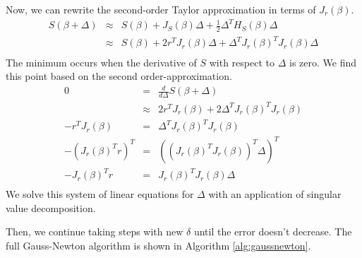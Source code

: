 Now, we can rewrite the second-order Taylor approximation in terms of $J_r(\beta)$.
\begin{eqnarray*}
	S(\beta + \Delta) &\approx& S(\beta) + J_S(\beta) \Delta + \frac{1}{2}\Delta^T H_S(\beta) \Delta\\
	&\approx& S(\beta) + 2 r^T J_r(\beta) \Delta + \Delta^T J_r(\beta)^T J_r(\beta) \Delta\\
\end{eqnarray*}
\noindent The minimum occurs when the derivative of $S$ with respect to $\Delta$ is zero. We find this point based
on the second order-approximation.
\begin{eqnarray*}
0 &=& \frac{d}{d\Delta} S(\beta + \Delta)\\
  &\approx& 2 r^T J_r(\beta) + 2 \Delta^T J_r(\beta)^T J_r(\beta)\\
  -r^T J_r(\beta) &=& \Delta^T J_r(\beta)^T J_r(\beta)\\
  -\left(J_r(\beta)^T r\right)^T &=& \left(\left(J_r(\beta)^T J_r(\beta)\right)^T \Delta\right)^T\\
  -J_r(\beta)^T r &=& J_r(\beta)^T J_r(\beta) \Delta\\
\end{eqnarray*}
We solve this system of linear equations for $\Delta$ with an application of singular value decomposition.

Then, we continue taking steps with new $\delta$ until the error doesn't decrease. The full Gauss-Newton
algorithm is shown in Algorithm \ref{alg:gaussnewton}.

